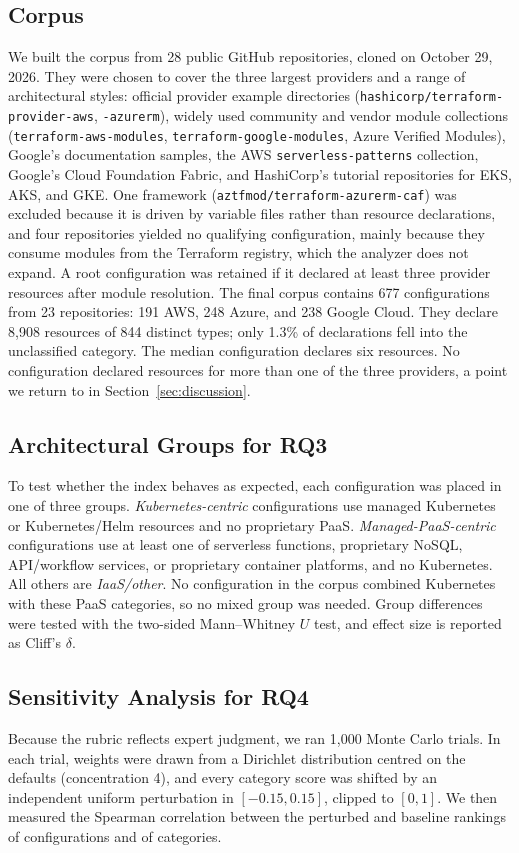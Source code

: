 \documentclass[conference]{IEEEtran}
\begin{document}
\subsection{Corpus}
We built the corpus from 28 public GitHub repositories, cloned on October 29, 2026. They were chosen to cover the three largest providers and a range of architectural styles: official provider example directories (\texttt{hashicorp/terraform-provider-aws}, \texttt{-azurerm}), widely used community and vendor module collections (\texttt{terraform-aws-modules}, \texttt{terraform-google-modules}, Azure Verified Modules), Google's documentation samples, the AWS \texttt{serverless-patterns} collection, Google's Cloud Foundation Fabric, and HashiCorp's tutorial repositories for EKS, AKS, and GKE. One framework (\texttt{aztfmod/terraform-azurerm-caf}) was excluded because it is driven by variable files rather than resource declarations, and four repositories yielded no qualifying configuration, mainly because they consume modules from the Terraform registry, which the analyzer does not expand. A root configuration was retained if it declared at least three provider resources after module resolution. The final corpus contains 677 configurations from 23 repositories: 191 AWS, 248 Azure, and 238 Google Cloud. They declare 8{,}908 resources of 844 distinct types; only 1.3\% of declarations fell into the unclassified category. The median configuration declares six resources. No configuration declared resources for more than one of the three providers, a point we return to in Section~\ref{sec:discussion}.

\subsection{Architectural Groups for RQ3}
To test whether the index behaves as expected, each configuration was placed in one of three groups. \emph{Kubernetes-centric} configurations use managed Kubernetes or Kubernetes/Helm resources and no proprietary PaaS. \emph{Managed-PaaS-centric} configurations use at least one of serverless functions, proprietary NoSQL, API/workflow services, or proprietary container platforms, and no Kubernetes. All others are \emph{IaaS/other}. No configuration in the corpus combined Kubernetes with these PaaS categories, so no mixed group was needed. Group differences were tested with the two-sided Mann--Whitney $U$ test, and effect size is reported as Cliff's $\delta$.

\subsection{Sensitivity Analysis for RQ4}
Because the rubric reflects expert judgment, we ran 1{,}000 Monte Carlo trials. In each trial, weights were drawn from a Dirichlet distribution centred on the defaults (concentration 4), and every category score was shifted by an independent uniform perturbation in $[-0.15, 0.15]$, clipped to $[0,1]$. We then measured the Spearman correlation between the perturbed and baseline rankings of configurations and of categories.
\end{document}
